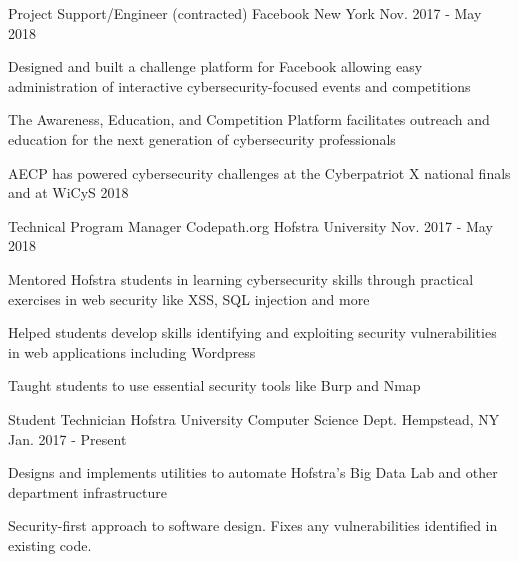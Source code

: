 

\begin{cventries}


\cventry
    {Project Support/Engineer (contracted) } %
    {Facebook} %
    {New York} %
    {Nov. 2017 - May 2018} %
    {
      \begin{cvitems} %
      \item {Designed and built a challenge platform for Facebook allowing easy administration of interactive cybersecurity-focused events and competitions}
      \item {The Awareness, Education, and Competition Platform facilitates outreach and education for the next generation of cybersecurity professionals}
      \item {AECP has powered cybersecurity challenges at the Cyberpatriot X national finals and at WiCyS 2018}
      \end{cvitems}
    }

\cventry
    {Technical Program Manager} %
    {Codepath.org} %
    {Hofstra University} %
    {Nov. 2017 - May 2018} %
    {
      \begin{cvitems} %
        \item {Mentored Hofstra students in learning cybersecurity skills through practical exercises in web security like XSS, SQL injection and more}
        \item {Helped students develop skills identifying and exploiting security vulnerabilities in web applications including Wordpress}
        \item {Taught students to use essential security tools like Burp and Nmap}
      \end{cvitems}
    }

  \cventry
    {Student Technician} %
    {Hofstra University Computer Science Dept.} %
    {Hempstead, NY} %
    {Jan. 2017 - Present} %
    {
      \begin{cvitems} %
        \item {Designs and implements utilities to automate Hofstra's Big Data Lab and other department infrastructure}
        \item {Security-first approach to software design. Fixes any vulnerabilities identified in existing code.} 
      \end{cvitems}
    }

\end{cventries}
